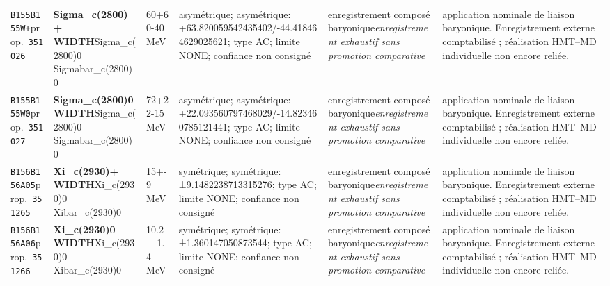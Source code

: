 \begin{landscape}
\begin{longtable}{L{1.85cm}L{4.45cm}L{2.35cm}L{4.05cm}L{3.35cm}L{7.15cm}}
\texttt{B155}\newline \texttt{B155W+}\newline prop.\ \texttt{351026} & \textbf{Sigma\_\allowbreak{}c(2800)+ WIDTH}\newline Sigma\_\allowbreak{}c(2800)0 \textbar{}\allowbreak{} Sigmabar\_\allowbreak{}c(2800)0 & 60+60-40\,MeV & asymétrique; asymétrique: +63.820059542435402/-44.418464629025621; type AC; limite NONE; confiance non consigné & enregistrement composé baryonique\newline \emph{enregistrement exhaustif sans promotion comparative} & application nominale de liaison baryonique. Enregistrement externe comptabilisé ; réalisation HMT--MD individuelle non encore reliée. \\
\texttt{B155}\newline \texttt{B155W0}\newline prop.\ \texttt{351027} & \textbf{Sigma\_\allowbreak{}c(2800)0 WIDTH}\newline Sigma\_\allowbreak{}c(2800)0 \textbar{}\allowbreak{} Sigmabar\_\allowbreak{}c(2800)0 & 72+22-15\,MeV & asymétrique; asymétrique: +22.093560797468029/-14.823460785121441; type AC; limite NONE; confiance non consigné & enregistrement composé baryonique\newline \emph{enregistrement exhaustif sans promotion comparative} & application nominale de liaison baryonique. Enregistrement externe comptabilisé ; réalisation HMT--MD individuelle non encore reliée. \\
\texttt{B156}\newline \texttt{B156A05}\newline prop.\ \texttt{351265} & \textbf{Xi\_\allowbreak{}c(2930)+ WIDTH}\newline Xi\_\allowbreak{}c(2930)0 \textbar{}\allowbreak{} Xibar\_\allowbreak{}c(2930)0 & 15+-9\,MeV & symétrique; symétrique: ±9.1482238713315276; type AC; limite NONE; confiance non consigné & enregistrement composé baryonique\newline \emph{enregistrement exhaustif sans promotion comparative} & application nominale de liaison baryonique. Enregistrement externe comptabilisé ; réalisation HMT--MD individuelle non encore reliée. \\
\texttt{B156}\newline \texttt{B156A06}\newline prop.\ \texttt{351266} & \textbf{Xi\_\allowbreak{}c(2930)0 WIDTH}\newline Xi\_\allowbreak{}c(2930)0 \textbar{}\allowbreak{} Xibar\_\allowbreak{}c(2930)0 & 10.2+-1.4\,MeV & symétrique; symétrique: ±1.360147050873544; type AC; limite NONE; confiance non consigné & enregistrement composé baryonique\newline \emph{enregistrement exhaustif sans promotion comparative} & application nominale de liaison baryonique. Enregistrement externe comptabilisé ; réalisation HMT--MD individuelle non encore reliée. \\

\end{longtable}
\end{landscape}
